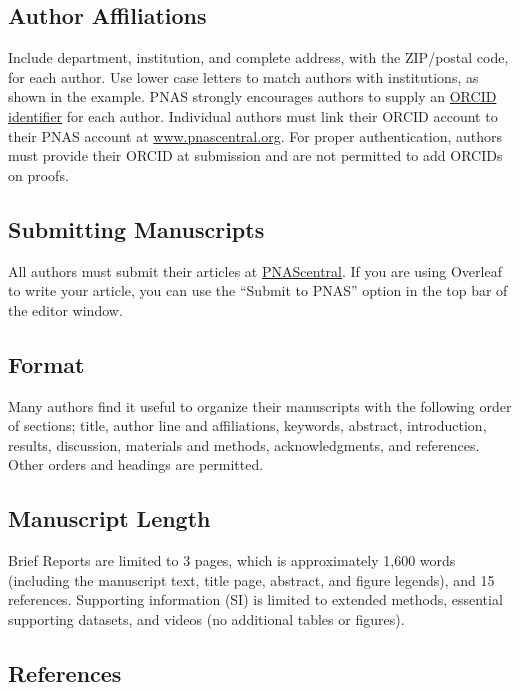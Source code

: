 \documentclass[9pt,twocolumn,twoside,lineno]{pnas-new}
\begin{document}
\subsection*{Author Affiliations}

Include department, institution, and complete address, with the ZIP/postal code, for each author. Use lower case letters to match authors with institutions, as shown in the example. PNAS strongly encourages authors to supply an \href{https://orcid.org/}{ORCID identifier} for each author. Individual authors must link their ORCID account to their PNAS account at \href{http://www.pnascentral.org/}{www.pnascentral.org}. For proper authentication, authors must provide their ORCID at submission and are not permitted to add ORCIDs on proofs.

\subsection*{Submitting Manuscripts}

All authors must submit their articles at \href{http://www.pnascentral.org/cgi-bin/main.plex}{PNAScentral}. If you are using Overleaf to write your article, you can use the ``Submit to PNAS'' option in the top bar of the editor window. 

\subsection*{Format}

Many authors find it useful to organize their manuscripts with the following order of sections; title, author line and affiliations, keywords, abstract, introduction, results, discussion, materials and methods, acknowledgments, and references. Other orders and headings are permitted.

\subsection*{Manuscript Length}

Brief Reports are limited to 3 pages, which is approximately 1,600 words (including the manuscript text, title page, abstract, and figure legends), and 15 references. Supporting information (SI) is limited to extended methods, essential supporting datasets, and videos (no additional tables or figures).


\subsection*{References}
\end{document}
